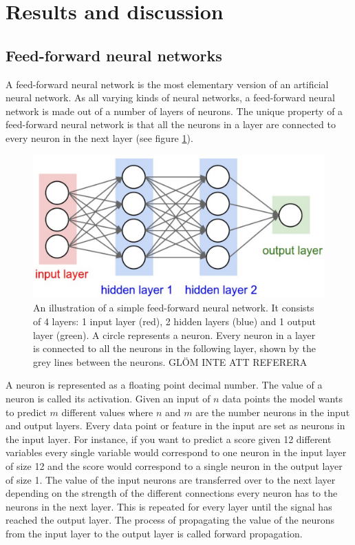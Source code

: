 \documentclass[a4paper,11pt,twoside]{article}
\begin{document}
\newpage
\section{Results and discussion}

\subsection{Feed-forward neural networks}
A feed-forward neural network is the most elementary version of an artificial neural network. As all varying kinds of neural networks, a feed-forward neural network is made out of a number of layers of neurons. The unique property of a feed-forward neural network is that all the neurons in a layer are connected to every neuron in the next layer (see figure \ref{figfeedforward}). \cite{cs231n}

\begin{figure}[h]
	\centering
  		\includegraphics[scale=1]{feedforward.png}
  	\caption{An illustration of a simple feed-forward neural network. It consists of 4 layers: 1 input layer (red), 2 hidden layers (blue) and 1 output layer (green). A circle represents a neuron. Every neuron in a layer is connected to all the neurons in the following layer, shown by the grey lines between the neurons. GLÖM INTE ATT REFERERA} \label{figfeedforward}
\end{figure}

A neuron is represented as a floating point decimal number. The value of a neuron is called its activation. Given an input of $n$ data points the model wants to predict $m$ different values where $n$ and $m$ are the number neurons in the input and output layers. Every data point or feature in the input are set as neurons in the input layer. For instance, if you want to predict a score given 12 different variables every single variable would correspond to one neuron in the input layer of size 12 and the score would correspond to a single neuron in the output layer of size 1. The value of the input neurons are transferred over to the next layer depending on the strength of the different connections every neuron has to the neurons in the next layer. This is repeated for every layer until the signal has reached the output layer. The process of propagating the value of the neurons from the input layer to the output layer is called forward propagation. \cite{cs231n}
\end{document}
